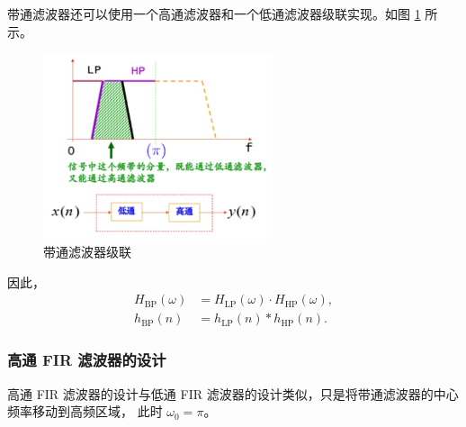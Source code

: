 \begin{note}
    带通滤波器还可以使用一个高通滤波器和一个低通滤波器级联实现。如图 \ref{fig:band_pass_filter_cascade} 所示。
    \begin{figure}[H]
        \centering
        \includegraphics[width=0.6\textwidth]{chap4/img/band_pass_filter_cascade.png}
        \caption{带通滤波器级联}
        \label{fig:band_pass_filter_cascade}
    \end{figure}
    因此，
    \begin{align*}
        H_{\text{BP}}(\omega) & = H_{\text{LP}}(\omega) \cdot H_{\text{HP}}(\omega), \\
        h_{\text{BP}}(n) & = h_{\text{LP}}(n) * h_{\text{HP}}(n).
    \end{align*}
\end{note}

\subsubsection{高通 FIR 滤波器的设计}

高通 FIR 滤波器的设计与低通 FIR 滤波器的设计类似，只是将带通滤波器的中心频率移动到高频区域，
此时 $\omega_0 = \pi$。

